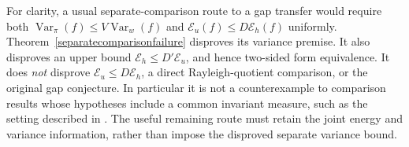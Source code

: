 For clarity, a usual separate-comparison route to a gap transfer would
require both $\operatorname{Var}_\pi(f)\leq V\operatorname{Var}_w(f)$
and $\mathcal E_u(f)\leq D\mathcal E_h(f)$ uniformly.
Theorem~\ref{separatecomparisonfailure} disproves its variance premise.
It also disproves an upper bound $\mathcal E_h\leq D'\mathcal E_u$,
and hence two-sided form equivalence. It does \emph{not} disprove
$\mathcal E_u\leq D\mathcal E_h$, a direct Rayleigh-quotient
comparison, or the original gap conjecture. In particular it is not
a counterexample to comparison results whose hypotheses include a common
invariant measure, such as the setting described in \cite{alpw2022}.
The useful remaining route must retain the joint energy and variance
information, rather than impose the disproved separate variance bound.
